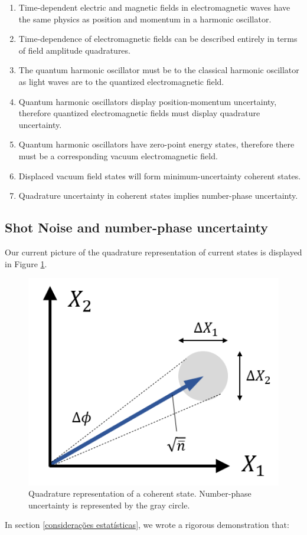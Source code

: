 \documentclass[12pt,a4paper]{report}
\begin{document}
\begin{enumerate}
    \item Time-dependent electric and magnetic fields in electromagnetic waves have the same physics as position and momentum in a harmonic oscillator.
    \item Time-dependence of electromagnetic fields can be described entirely in terms of field amplitude quadratures.
    \item The quantum harmonic oscillator must be to the classical harmonic oscillator as light waves are to the quantized electromagnetic field.
    \item Quantum harmonic oscillators display position-momentum uncertainty, therefore quantized electromagnetic fields must display quadrature uncertainty.
    \item Quantum harmonic oscillators have zero-point energy states, therefore there must be a corresponding vacuum electromagnetic field.
    \item Displaced vacuum field states will form minimum-uncertainty coherent states. \item Quadrature uncertainty in coherent states implies number-phase uncertainty.
\end{enumerate}

\subsection{Shot Noise and number-phase uncertainty}

Our current picture of the quadrature representation of current states is displayed in Figure \ref{quadrature.coherent}.

\begin{figure}[H]
    \centering
    \includegraphics[width=0.4\linewidth]{quadrature.estados.coerentes.png}
    \caption{Quadrature representation of a coherent state. Number-phase uncertainty is represented by the gray circle.}
    \label{quadrature.coherent}
\end{figure}

In section \ref{considerações estatísticas}, we wrote a rigorous demonstration that:
\end{document}
